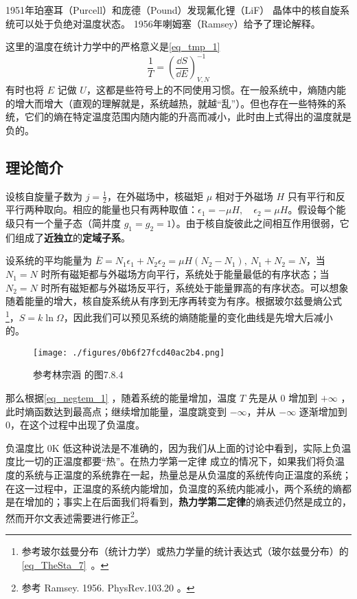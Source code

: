 
\begin{issues}
\issueDraft
\end{issues}

1951年珀塞耳（Purcell）和庞德（Pound）发现氟化锂（LiF） 晶体中的核自旋系统可以处于负绝对温度状态。
1956年喇姆塞（Ramsey）给予了理论解释。\cite{热统}

这里的温度在统计力学中的严格意义是\autoref{eq_tmp_1}~
\begin{equation}\label{eq_negtem_1}
\frac{1}{T}=\left(\frac{\dd S}{\dd E}\right)_{V,N}^{-1}
\end{equation}
有时也将 $E$ 记做 $U$，这都是些符号上的不同使用习惯。在一般系统中，熵随内能的增大而增大（直观的理解就是，系统越热，就越“乱”）。但也存在一些特殊的系统，它们的熵在特定温度范围内随内能的升高而减小，此时由上式得出的温度就是负的。

\subsection{理论简介}
设核自旋量子数为 $j=\frac{1}{2}$，在外磁场中，核磁矩 $\mu$ 相对于外磁场 $H$ 只有平行和反平行两种取向。相应的能量也只有两种取值：$\epsilon_1=-\mu H,\quad \epsilon_2=\mu H$。假设每个能级只有一个量子态（简并度 $g_1=g_2=1$）。由于核自旋彼此之间相互作用很弱，它们组成了\textbf{近独立}的\textbf{定域子系}。

设系统的平均能量为 $\bar{E}=N_1\epsilon_1+N_2\epsilon_2=\mu H(N_2-N_1),\ N_1+N_2=N$，当 $N_1=N$ 时所有磁矩都与外磁场方向平行，系统处于能量最低的有序状态；当 $N_2=N$ 时所有磁矩都与外磁场反平行，系统处于能量罪高的有序状态。可以想象随着能量的增大，核自旋系统从有序到无序再转变为有序。根据玻尔兹曼熵公式\footnote{参考玻尔兹曼分布（统计力学）或热力学量的统计表达式（玻尔兹曼分布）的\autoref{eq_TheSta_7}~。}，$S=k\ln \Omega$，因此我们可以预见系统的熵随能量的变化曲线是先增大后减小的。
\begin{figure}[ht]
\centering
\texttt{[image: ./figures/0b6f27fcd40ac2b4.png]}
\caption{参考林宗涵\cite{林宗涵} 的图7.8.4} \label{fig_negtem_1}
\end{figure}
那么根据\autoref{eq_negtem_1} ，随着系统的能量增加，温度 $T$ 先是从 $0$ 增加到 $+\infty$ ，此时熵函数达到最高点；继续增加能量，温度跳变到 $-\infty$，并从 $-\infty$ 逐渐增加到 $0$，在这个过程中出现了负温度。

负温度比 $0 \mathrm{K}$ 低这种说法是不准确的，因为我们从上面的讨论中看到，实际上负温度比一切的正温度都要“热”。在热力学第一定律 成立的情况下，如果我们将负温度的系统与正温度的系统靠在一起，热量总是从负温度的系统传向正温度的系统；在这一过程中，正温度的系统内能增加，负温度的系统内能减小，两个系统的熵都是在增加的；事实上在后面我们将看到，\textbf{热力学第二定律}的熵表述仍然是成立的，然而开尔文表述需要进行修正\footnote{参考 Ramsey. 1956. PhysRev.103.20 。}。


